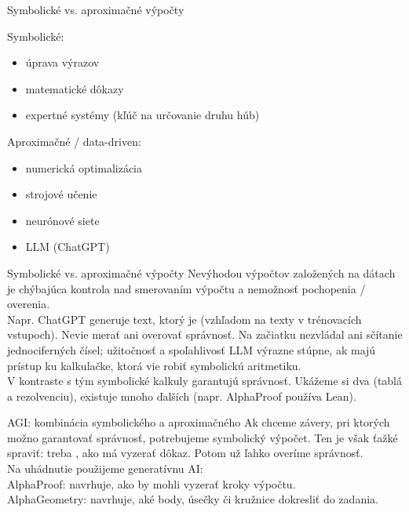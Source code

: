 \documentclass[12pt]{beamer}
\theoremstyle{definition}
\begin{document}
\begin{frame}{Symbolické vs. aproximačné výpočty}
\begin{minipage}[t]{0.45\textwidth}
Symbolické:
\begin{itemize}
	\item úprava výrazov
	\item matematické dôkazy
	\item expertné systémy (kľúč na určovanie druhu húb)
\end{itemize}
\end{minipage}
\quad
\begin{minipage}[t]{0.45\textwidth}
Aproximačné / data-driven:
\begin{itemize}
	\item numerická optimalizácia
	\item strojové učenie
	\item neurónové siete
	\item LLM (ChatGPT)
\end{itemize}
\end{minipage}
\end{frame}

\begin{frame}{Symbolické vs. aproximačné výpočty}
Nevýhodou výpočtov založených na dátach je chýbajúca kontrola nad smerovaním výpočtu a nemožnosť pochopenia / overenia.\\[3mm]

Napr. ChatGPT generuje text, ktorý je  (vzhľadom na texty v trénovacích vstupoch). Nevie merať ani overovať správnosť.
Na začiatku nezvládal ani sčítanie jednociferných čísel; užitočnosť a spoľahlivosť LLM výrazne stúpne, ak majú prístup ku kalkulačke, ktorá vie robiť symbolickú aritmetiku.\\[3mm]

V kontraste s tým symbolické kalkuly garantujú správnosť. Ukážeme si dva (tablá a rezolvenciu), existuje mnoho ďalších (napr. AlphaProof používa Lean).
\end{frame}

\begin{frame}{AGI: kombinácia symbolického a aproximačného}
Ak chceme závery, pri ktorých možno garantovať správnosť, potrebujeme symbolický výpočet. Ten je však ťažké spraviť: treba , ako má vyzerať dôkaz. Potom už ľahko overíme správnosť.\\[3mm]

Na uhádnutie použijeme generatívnu AI:\\
AlphaProof: navrhuje, ako by mohli vyzerať kroky výpočtu.\\
AlphaGeometry: navrhuje, aké body, úsečky či kružnice dokresliť do zadania.
\end{frame}
\end{document}
